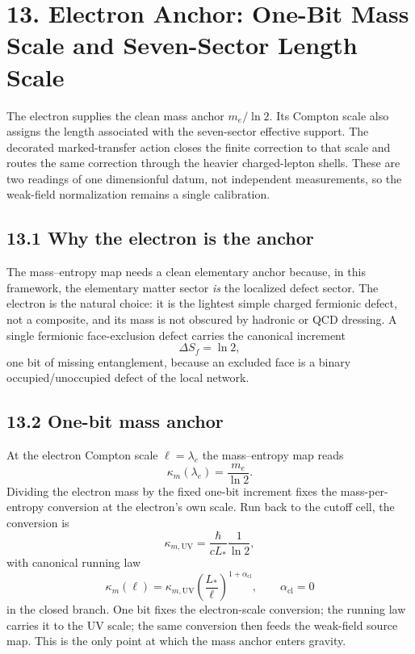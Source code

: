 \documentclass[11pt]{article}
\begin{document}
\section{13. Electron Anchor: One-Bit Mass Scale and Seven-Sector Length Scale}

The electron supplies the clean mass anchor $m_e/\ln2$. Its Compton scale also assigns the length associated with the seven-sector effective support. The decorated marked-transfer action closes the finite correction to that scale and routes the same correction through the heavier charged-lepton shells. These are two readings of one dimensionful datum, not independent measurements, so the weak-field normalization remains a single calibration.

\subsection{13.1 Why the electron is the anchor}

The mass--entropy map needs a clean elementary anchor because, in this framework, the elementary matter sector \emph{is} the localized defect sector. The electron is the natural choice: it is the lightest simple charged fermionic defect, not a composite, and its mass is not obscured by hadronic or QCD dressing. A single fermionic face-exclusion defect carries the canonical increment
\[
\Delta S_f=\ln 2,
\]
one bit of missing entanglement, because an excluded face is a binary occupied/unoccupied defect of the local network.

\subsection{13.2 One-bit mass anchor}

At the electron Compton scale $\ell=\lambda_e$ the mass--entropy map reads
\[
\kappa_m(\lambda_e)=\frac{m_e}{\ln 2}.
\]
Dividing the electron mass by the fixed one-bit increment fixes the mass-per-entropy conversion at the electron's own scale. Run back to the cutoff cell, the conversion is
\[
\kappa_{m,\mathrm{UV}}=\frac{\hbar}{cL_*}\frac{1}{\ln 2},
\]
with canonical running law
\[
\kappa_m(\ell)=\kappa_{m,\mathrm{UV}}\left(\frac{L_*}{\ell}\right)^{1+\alpha_{\mathrm{cl}}},
\qquad
\alpha_{\mathrm{cl}}=0
\]
in the closed branch. One bit fixes the electron-scale conversion; the running law carries it to the UV scale; the same conversion then feeds the weak-field source map. This is the only point at which the mass anchor enters gravity.
\end{document}
